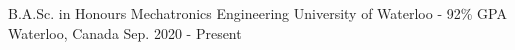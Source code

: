 

\begin{cventries}

  \educationentry
    {B.A.Sc. in Honours Mechatronics Engineering} %
    {University of Waterloo - 92\% GPA} %
    {Waterloo, Canada} %
    {Sep. 2020 - Present} %
\end{cventries}
